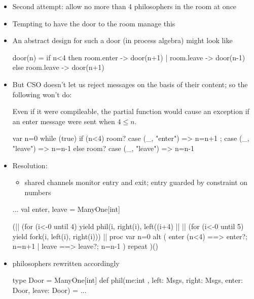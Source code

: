 \documentclass{concdistfoils}
\begin{document}
\begin{slide}
\begin{itemize}
\item Second attempt: allow no more than 4 philosophers in the room at once
\item Tempting to have the door to the room manage this
\item An abstract design for such a door (in process algebra) might look like
\vfill
\begin{scala}
   door(n) = if n<4 then { room.enter -> door(n+1) 
                         | room.leave -> door(n-1)
                         }
             else        { room.leave -> door(n+1) }
\end{scala}
\vfill
\item But CSO doesn't let us reject messages on the basis of their content; so the following 
      won't do:
\begin{note}
Even if it were compileable, the partial function 
would cause an exception if an enter message were sent when $4\le n$.
\end{note}
\vfill
\begin{scala}
   var n=0
   while (true)
   if (n<4) { room?{ case (_, "enter") => n=n+1 ;
                     case (_, "leave") => n=n-1 }
            }
   else     { room?{ case (_, "leave") => n=n-1 } }
\end{scala}
\end{itemize}
\end{slide}

\begin{slide}
\begin{itemize}
\item Resolution: 
\vfill
\begin{itemize}
\item shared channels monitor entry and exit; entry guarded by constraint on numbers
\end{itemize}
\begin{scala}
  ...
  val  enter, leave = ManyOne[int]
      
  (|| (for (i<-0 until 4) yield phil(i, right(i),  left((i+4)%
   || || (for (i<-0 until 5) yield fork(i, left(i),   right(i)))
   || proc
      { var n=0
        alt ( enter (n<4) ==> { enter?; n=n+1 } | leave  ==> { leave?; n=n-1 } ) repeat 
      }
  )()
 \end{scala}
\vfill
\item philosophers rewritten accordingly
\begin{scala}
    type Door = ManyOne[int]
    def phil(me:int , left: Msgs, right: Msgs, enter: Door, leave: Door) = ...
\end{scala}
\vfill
\vfill
\end{itemize}
\end{slide}
\end{document}
